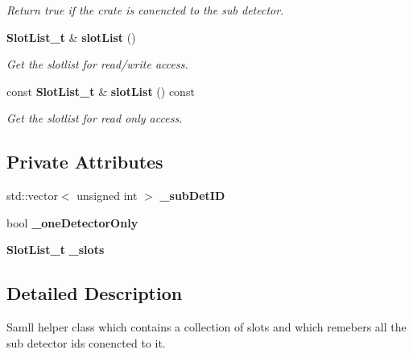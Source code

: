 \begin{DoxyCompactItemize}
\begin{DoxyCompactList}\small\item\em Return true if the crate is conencted to the sub detector. \item\end{DoxyCompactList}\item 
{\bf SlotList\_\-t} \& {\bf slotList} ()\label{classCALICE_1_1TriggerHandlerCalice_1_1Crate__t_ab71658dc613ae2c3d5f683d643838567}

\begin{DoxyCompactList}\small\item\em Get the slotlist for read/write access. \item\end{DoxyCompactList}\item 
const {\bf SlotList\_\-t} \& {\bf slotList} () const \label{classCALICE_1_1TriggerHandlerCalice_1_1Crate__t_a9bd990db0cf9d53c6946e697faabd6f7}

\begin{DoxyCompactList}\small\item\em Get the slotlist for read only access. \item\end{DoxyCompactList}\end{DoxyCompactItemize}
\subsection*{Private Attributes}
\begin{DoxyCompactItemize}
\item 
std::vector$<$ unsigned int $>$ {\bfseries \_\-subDetID}\label{classCALICE_1_1TriggerHandlerCalice_1_1Crate__t_a49e7c92525f987ffb4b8b83446935ce1}

\item 
bool {\bfseries \_\-oneDetectorOnly}\label{classCALICE_1_1TriggerHandlerCalice_1_1Crate__t_af6fa23743ffea3d191ab389b996cd6b7}

\item 
{\bf SlotList\_\-t} {\bfseries \_\-slots}\label{classCALICE_1_1TriggerHandlerCalice_1_1Crate__t_af7e308e0893ec31e1d83d54e5856371b}

\end{DoxyCompactItemize}


\subsection{Detailed Description}
Samll helper class which contains a collection of slots and which remebers all the sub detector ids conencted to it. 

